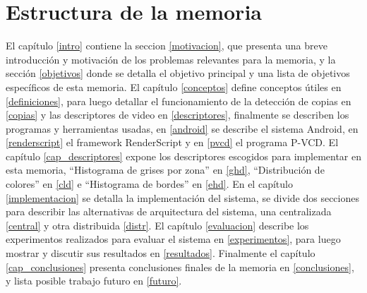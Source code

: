 \section{Estructura de la memoria}
El capítulo \ref{intro} contiene la seccion \ref{motivacion}, que presenta una breve introducción y motivación de los problemas relevantes para la memoria, y la sección \ref{objetivos} donde se detalla el objetivo principal y una lista de objetivos específicos de esta memoria.
El capítulo \ref{conceptos} define conceptos útiles en \ref{definiciones}, para luego detallar el funcionamiento de la detección de copias en \ref{copias} y las descriptores de video en \ref{descriptores}, finalmente se describen los programas y herramientas usadas, en \ref{android} se describe el sistema Android, en \ref{renderscript} el framework RenderScript y en \ref{pvcd} el programa P-VCD.
El capítulo \ref{cap_descriptores} expone los descriptores escogidos para implementar en esta memoria, ``Histograma de grises por zona'' en \ref{ghd}, ``Distribución de colores'' en \ref{cld} e ``Histograma de bordes'' en \ref{ehd}.
En el capítulo \ref{implementacion} se detalla la implementación del sistema, se divide dos secciones para describir las alternativas de arquitectura del sistema, una centralizada \ref{central} y otra distribuida \ref{distr}.
El capítulo \ref{evaluacion} describe los experimentos realizados para evaluar el sistema en \ref{experimentos}, para luego mostrar y discutir sus resultados en \ref{resultados}.
Finalmente el capítulo \ref{cap_conclusiones} presenta conclusiones finales de la memoria en \ref{conclusiones}, y lista posible trabajo futuro en \ref{futuro}.

